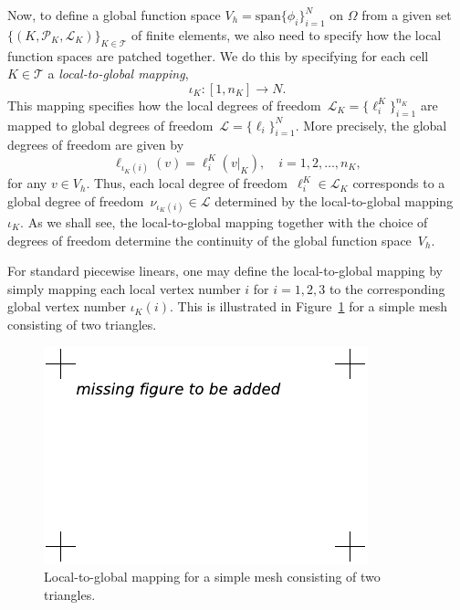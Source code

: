 Now, to define a global function space $V_h = \mathrm{span}
\{\phi_i\}_{i=1}^N$ on $\Omega$ from a given set $\{(K,
\mathcal{P}_K,\mathcal{L}_K)\}_{K\in\mathcal{T}}$ of finite elements,
we also need to specify how the local function spaces are patched
together. We do this by specifying for each cell $K \in \mathcal{T}$ a
\emph{local-to-global mapping},
\begin{equation}
  \iota_K : [1,n_K] \rightarrow N.
\end{equation}
This mapping specifies how the local degrees of freedom~$\mathcal{L}_K
= \{\ell_i^K\}_{i=1}^{n_K}$ are mapped to global degrees of
freedom~$\mathcal{L} = \{\ell_i\}_{i=1}^N$. More precisely, the global
degrees of freedom are given by
\begin{equation} \label{eq:nodemapping}
  \ell_{\iota_K(i)}(v) = \ell^K_i(v|_K), \quad i = 1,2,\ldots,n_K,
\end{equation}
for any $v\in V_h$. Thus, each local degree of freedom~$\ell^K_i \in
\mathcal{L}_K$ corresponds to a global degree of
freedom~$\nu_{\iota_K(i)} \in \mathcal{L}$ determined by the
local-to-global mapping $\iota_K$. As we shall see, the
local-to-global mapping together with the choice of degrees of freedom
determine the continuity of the global function space~$V_h$.

For standard piecewise linears, one may define the local-to-global
mapping by simply mapping each local vertex number $i$ for $i=1,2,3$
to the corresponding global vertex number $\iota_K(i)$. This is
illustrated in Figure~\ref{fig:dofmap} for a simple mesh consisting
of two triangles.

\begin{figure}
  \begin{center}
    \includegraphics[width=\largefig]{chapters/kirby-7/pdf/missing-figure.pdf}
    \caption{Local-to-global mapping for a simple mesh consisting of
      two triangles.}
    \label{fig:dofmap}
  \end{center}
\end{figure}

